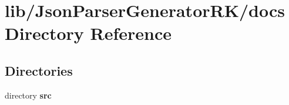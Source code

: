 \section{lib/\+Json\+Parser\+Generator\+R\+K/docs Directory Reference}
\label{dir_ffcc7310353ad02945b27fb4e9fff461}
\subsection*{Directories}
\begin{DoxyCompactItemize}
\item 
directory \textbf{ src}
\end{DoxyCompactItemize}
